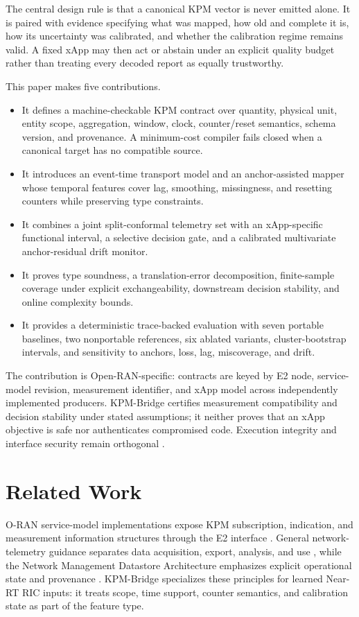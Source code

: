 \documentclass[10pt,journal,twoside]{IEEEtran}
\begin{document}
The central design rule is that a canonical KPM vector is never emitted alone. It is paired with evidence specifying what was mapped, how old and complete it is, how its uncertainty was calibrated, and whether the calibration regime remains valid. A fixed xApp may then act or abstain under an explicit quality budget rather than treating every decoded report as equally trustworthy.

This paper makes five contributions.
\begin{itemize}
\item It defines a machine-checkable KPM contract over quantity, physical unit, entity scope, aggregation, window, clock, counter/reset semantics, schema version, and provenance. A minimum-cost compiler fails closed when a canonical target has no compatible source.
\item It introduces an event-time transport model and an anchor-assisted mapper whose temporal features cover lag, smoothing, missingness, and resetting counters while preserving type constraints.
\item It combines a joint split-conformal telemetry set with an xApp-specific functional interval, a selective decision gate, and a calibrated multivariate anchor-residual drift monitor.
\item It proves type soundness, a translation-error decomposition, finite-sample coverage under explicit exchangeability, downstream decision stability, and online complexity bounds.
\item It provides a deterministic trace-backed evaluation with seven portable baselines, two nonportable references, six ablated variants, cluster-bootstrap intervals, and sensitivity to anchors, loss, lag, miscoverage, and drift.
\end{itemize}

The contribution is Open-RAN-specific: contracts are keyed by E2 node, service-model revision, measurement identifier, and xApp model across independently implemented producers. KPM-Bridge certifies measurement compatibility and decision stability under stated assumptions; it neither proves that an xApp objective is safe nor authenticates compromised code. Execution integrity and interface security remain orthogonal \cite{groen2025security}.

\section{Related Work}
O-RAN service-model implementations expose KPM subscription, indication, and measurement information structures through the E2 interface \cite{garcia2021oran,feraudo2024xdevsm}. General network-telemetry guidance separates data acquisition, export, analysis, and use \cite{song2022telemetry,tan2021int}, while the Network Management Datastore Architecture emphasizes explicit operational state and provenance \cite{bjorklund2018nmda}. KPM-Bridge specializes these principles for learned Near-RT RIC inputs: it treats scope, time support, counter semantics, and calibration state as part of the feature type.
\end{document}
